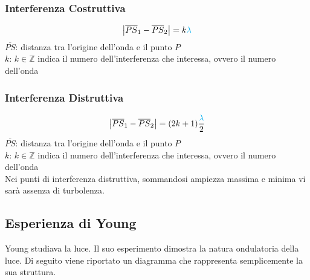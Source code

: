 \subsubsection{Interferenza Costruttiva}
\begin{equation*}
\left\lvert \overline{PS}_1-\overline{PS}_2 \right\rvert = k\mathcolor{cyan}{\lambda}
\end{equation*}
$\overline{PS}$: distanza tra l'origine dell'onda e il punto $P$\\
$k$: $k\in\mathbb{Z}$ indica il numero dell'interferenza che interessa, ovvero il numero dell'onda

\subsubsection{Interferenza Distruttiva}
\begin{equation*}
\left\lvert \overline{PS}_1-\overline{PS}_2 \right\rvert = 
(2k + 1)\frac{\mathcolor{cyan}{\lambda}}{2}
\end{equation*}
$\overline{PS}$: distanza tra l'origine dell'onda e il punto $P$\\
$k$: $k\in\mathbb{Z}$ indica il numero dell'interferenza che interessa, ovvero il numero dell'onda\\
[\baselineskip]

Nei punti di interferenza distruttiva, sommandosi ampiezza massima e minima vi sarà assenza di 
turbolenza.

\subsection{Esperienza di Young}\label{subsec:onde:young}
Young studiava la luce. Il suo esperimento dimostra la natura ondulatoria della luce. Di seguito
viene riportato un diagramma che rappresenta semplicemente la sua struttura.

